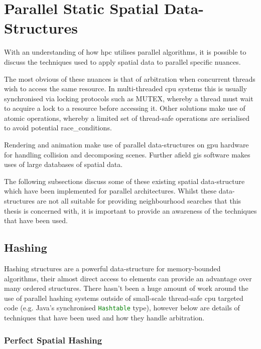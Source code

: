 \section{Parallel Static Spatial Data-Structures\label{sec:parallel-static-spatial}}
  With an understanding of how \gls{hpc} utilises parallel algorithms, it is possible to discuss the techniques used to apply spatial data to parallel specific nuances.
  
  The most obvious of these nuances is that of arbitration when concurrent threads wish to access the same resource. In multi-threaded \gls{cpu} systems this is usually synchronised via locking protocols such as MUTEX, whereby a thread must wait to acquire a lock to a resource before accessing it. Other solutions make use of \gls{atomic} operations, whereby a limited set of thread-safe operations are  serialised to avoid potential \glspl{race_condition}.
  
  Rendering and animation make use of parallel data-structures on \gls{gpu} hardware for handling collision and decomposing scenes. Further afield \gls{gis} software makes uses of large databases of spatial data.
  
  The following subsections discuss some of these existing spatial data-structure which have been implemented for parallel architectures. Whilst these data-structures are not all suitable for providing neighbourhood searches that this thesis is concerned with, it is important to provide an awareness of the techniques that have been used.
  
  \subsection{Hashing\label{subsec:parallel-hash}}
    Hashing structures are a powerful data-structure for memory-bounded algorithms, their almost direct access to elements can provide an advantage over many ordered structures. There hasn't been a huge amount of work around the use of parallel hashing systems outside of small-scale thread-safe \gls{cpu} targeted code (e.g. Java's synchronised \lstinline[language={Java}]!Hashtable! type), however below are details of techniques that have been used and how they handle arbitration.
    
    \subsubsection*{Perfect Spatial Hashing}

